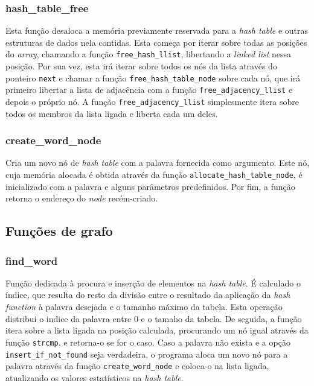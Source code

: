 \documentclass[portuguese,11pt,a4paper,titlepage]{article}
\newcommand{\foreign}[1]{\textit{#1}}
\begin{document}
\subsubsection{hash\_table\_free}
Esta função desaloca a memória previamente reservada para a \foreign{hash table} e outras
estruturas de dados nela contidas. Esta começa por iterar sobre todas as posições do \foreign{array}, chamando a função \verb|free_hash_llist|, libertando a \foreign{linked list} nessa posição. Por sua vez, esta irá iterar sobre todos os nós da lista através
do ponteiro \verb|next| e chamar a função \verb|free_hash_table_node| sobre cada nó, que irá primeiro libertar a lista de adjacência com a função \verb|free_adjacency_llist| e depois o próprio nó. A função \verb|free_adjacency_llist| simplesmente itera sobre todos
os membros da lista ligada e liberta cada um deles.

\subsubsection{create\_word\_node}
Cria um novo nó de \textit{hash table} com a palavra fornecida como argumento. Este nó, cuja memória alocada é obtida através da função \verb|allocate_hash_table_node|, é inicializado com a palavra e alguns parâmetros predefinidos. Por fim, a função retorna o endereço do \textit{node} recém-criado.

\subsection{Funções de grafo}

\subsubsection{find\_word}
Função dedicada à procura e inserção de elementos na \foreign{hash table}. 
É calculado o índice, que resulta do resto da divisão entre o resultado da aplicação da \foreign{hash function} à palavra desejada e o tamanho máximo da tabela. Esta operação distribui o indice da palavra entre 0 e o tamaho da tabela. De seguida, a função itera sobre a lista ligada na posição calculada, procurando um nó igual através da função \verb|strcmp|, e retorna-o se for o caso.
Caso a palavra não exista e a opção \verb|insert_if_not_found| seja verdadeira, o programa aloca um novo nó para a palavra através da função \verb|create_word_node| e coloca-o na lista ligada, atualizando os valores estatísticos na \foreign{hash table}.
\end{document}
